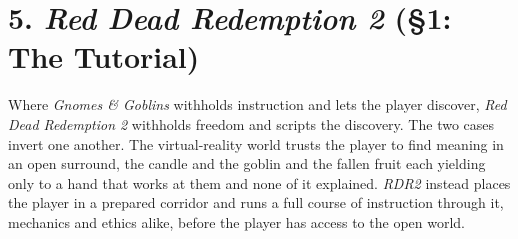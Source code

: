 
\bigskip

\section*{5. \textit{Red Dead Redemption 2} (§1: The Tutorial)}

Where \textit{Gnomes \& Goblins} withholds instruction and lets the player discover, \textit{Red Dead Redemption 2} withholds freedom and scripts the discovery. The two cases invert one another. The virtual-reality world trusts the player to find meaning in an open surround, the candle and the goblin and the fallen fruit each yielding only to a hand that works at them and none of it explained. \textit{RDR2} instead places the player in a prepared corridor and runs a full course of instruction through it, mechanics and ethics alike, before the player has access to the open world.

